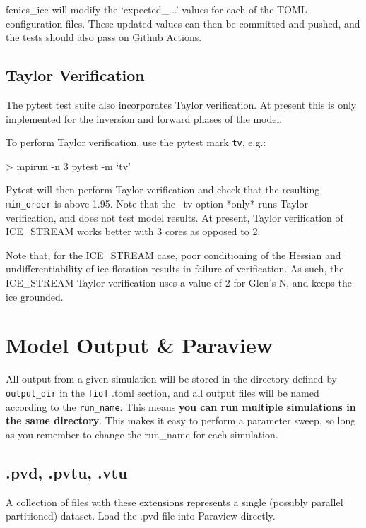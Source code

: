 \documentclass[11pt, reqno, nocenter]{article}
\begin{document}
fenics\_ice will modify the `expected\_...' values for each of the TOML configuration files. These updated values can then be committed and pushed, and the tests should also pass on Github Actions.

\subsection{Taylor Verification}

The pytest test suite also incorporates Taylor verification. At present this is only implemented for the inversion and forward phases of the model.

To perform Taylor verification, use the pytest mark \texttt{tv}, e.g.:
\begin{spverbatim}
> mpirun -n 3 pytest -m `tv'
\end{spverbatim}

Pytest will then perform Taylor verification and check that the resulting \texttt{min\_order} is above 1.95. Note that the --tv option *only* runs Taylor verification, and does not test model results. At present, Taylor verification of ICE\_STREAM works better with 3 cores as opposed to 2.

Note that, for the ICE\_STREAM case, poor conditioning of the Hessian and undifferentiability of ice flotation results in failure of verification. As such, the ICE\_STREAM Taylor verification uses a value of 2 for Glen's N, and keeps the ice grounded.

\section{Model Output \& Paraview}

All output from a given simulation will be stored in the directory defined by \texttt{output\_dir} in the \texttt{[io]} .toml section, and all output files will be named according to the \texttt{run\_name}. This means \textbf{you can run multiple simulations in the same directory}. This makes it easy to perform a parameter sweep, so long as you remember to change the run\_name for each simulation.

\subsection{.pvd, .pvtu, .vtu}

A collection of files with these extensions represents a single (possibly parallel partitioned) dataset. Load the .pvd file into Paraview directly.
\end{document}
